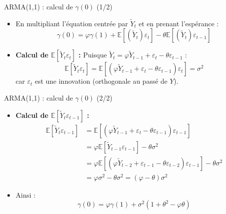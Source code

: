 \documentclass[11pt,aspectratio=169]{beamer}
\newcommand{\E}{\mathbb{E}}
\begin{document}
\begin{frame}{ARMA(1,1) : calcul de $\gamma(0)$ (1/2)}

\begin{itemize}

\item En multipliant l'équation centrée par $\tilde{Y}_t$ et en prenant l'espérance :
\[
\gamma(0) = \varphi \gamma(1) + \E[(\tilde{Y}_t) \varepsilon_t] - \theta \E[(\tilde{Y}_t) \varepsilon_{t-1}]
\]

\item \textbf{Calcul de $\E[\tilde{Y}_t \varepsilon_t]$ :}
Puisque $\tilde{Y}_t = \varphi \tilde{Y}_{t-1} + \varepsilon_t - \theta \varepsilon_{t-1}$ :
\[
\E[\tilde{Y}_t \varepsilon_t] = \E[(\varphi \tilde{Y}_{t-1} + \varepsilon_t - \theta \varepsilon_{t-1}) \varepsilon_t] = \sigma^2
\]
car $\varepsilon_t$ est une innovation (orthogonale au passé de $Y$).

\end{itemize}
\end{frame}

\begin{frame}{ARMA(1,1) : calcul de $\gamma(0)$ (2/2)}

\begin{itemize}

\item \textbf{Calcul de $\E[\tilde{Y}_t \varepsilon_{t-1}]$ :}
\begin{align*}
\E[\tilde{Y}_t \varepsilon_{t-1}] &= \E[(\varphi \tilde{Y}_{t-1} + \varepsilon_t - \theta \varepsilon_{t-1}) \varepsilon_{t-1}] \\
&= \varphi \E[\tilde{Y}_{t-1} \varepsilon_{t-1}] - \theta \sigma^2 \\
&= \varphi \E[(\varphi \tilde{Y}_{t-2} + \varepsilon_{t-1} - \theta \varepsilon_{t-2}) \varepsilon_{t-1}] - \theta \sigma^2 \\
&= \varphi \sigma^2 - \theta \sigma^2 = (\varphi - \theta) \sigma^2
\end{align*}

\item Ainsi :
\[
\boxed{\gamma(0) = \varphi \gamma(1) + \sigma^2 (1 + \theta^2 - \varphi \theta)}
\]

\end{itemize}
\end{frame}
\end{document}
